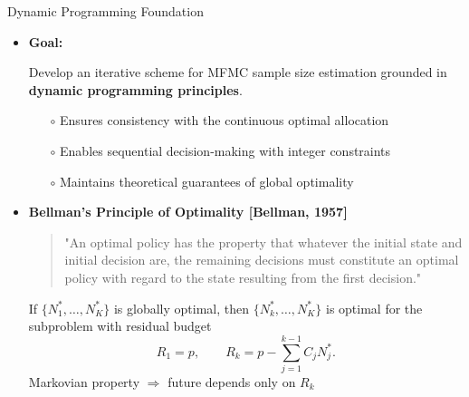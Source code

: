 \documentclass{beamer}
\begin{document}
\begin{frame}{Dynamic Programming Foundation}

\begin{itemize}[leftmargin=5pt] 
\item \textcolor{myblue3}{\bf Goal:} 
{\footnotesize
Develop an iterative scheme for MFMC sample size estimation grounded in
\textbf{dynamic programming principles}.

\begin{itemize}[leftmargin=15pt] 
\item[$\circ$]Ensures consistency with the continuous optimal allocation
    \item[$\circ$] Enables sequential decision-making with integer constraints
    \item[$\circ$] Maintains theoretical guarantees of global optimality
\end{itemize}
}
\vspace{1mm}
\item \textcolor{myblue3}{\bf Bellman's Principle of Optimality {\small [Bellman, 1957]}}
{\footnotesize
\begin{quote}
\vspace{2mm}
\textcolor{myblue3}{"An optimal policy has the property that whatever the initial state and initial decision are, the remaining decisions must constitute an optimal policy with regard to the state resulting from the first decision."}
\end{quote}

\vspace{1mm}
If $\{N_1^*, \ldots, N_K^*\}$ is globally optimal,  
then $\{N_k^*, \ldots, N_K^*\}$ is optimal for the subproblem
with residual budget
\[
R_1 = p, \qquad 
R_k = p - \sum_{j=1}^{k-1} C_j N_j^*.
\]
Markovian property $\Rightarrow$ future depends only on $R_k$
}
\end{itemize}

\end{frame}
\end{document}
